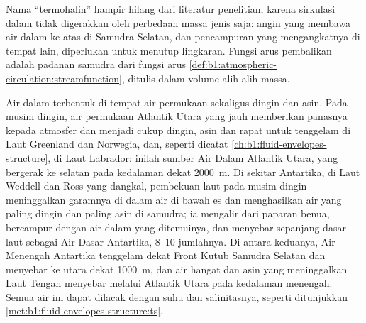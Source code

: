 Nama ``termohalin'' hampir hilang dari literatur penelitian, karena sirkulasi dalam tidak digerakkan oleh perbedaan massa jenis saja: angin yang membawa air dalam ke atas di Samudra Selatan, dan pencampuran yang mengangkatnya di tempat lain, diperlukan untuk menutup lingkaran. Fungsi arus pembalikan adalah padanan samudra dari fungsi arus \cref{def:b1:atmospheric-circulation:streamfunction}, ditulis dalam volume alih-alih massa.

Air dalam terbentuk di tempat air permukaan sekaligus dingin dan asin. Pada musim dingin, air permukaan Atlantik Utara yang jauh memberikan panasnya kepada atmosfer dan menjadi cukup dingin, asin dan rapat untuk tenggelam di Laut Greenland dan Norwegia, dan, seperti dicatat \cref{ch:b1:fluid-envelopes-structure}, di Laut Labrador: inilah sumber Air Dalam Atlantik Utara, yang bergerak ke selatan pada kedalaman dekat \qty{2000}{m}. Di sekitar Antartika, di Laut Weddell dan Ross yang dangkal, pembekuan laut pada musim dingin meninggalkan garamnya di dalam air di bawah es dan menghasilkan air yang paling dingin dan paling asin di samudra; ia mengalir dari paparan benua, bercampur dengan air dalam yang ditemuinya, dan menyebar sepanjang dasar laut sebagai Air Dasar Antartika, \qtyrange{8}{10}{\sverdrup} jumlahnya. Di antara keduanya, Air Menengah Antartika tenggelam dekat Front Kutub Samudra Selatan dan menyebar ke utara dekat \qty{1000}{m}, dan air hangat dan asin yang meninggalkan Laut Tengah menyebar melalui Atlantik Utara pada kedalaman menengah. Semua air ini dapat dilacak dengan suhu dan salinitasnya, seperti ditunjukkan \cref{met:b1:fluid-envelopes-structure:ts}.


